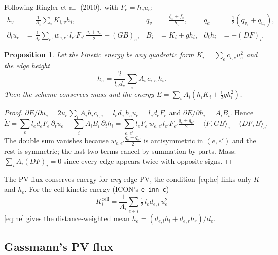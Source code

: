 \documentclass[11pt,a4paper]{article}
\newcommand{\code}[1]{\texttt{#1}}
\newtheorem{proposition}{Proposition}
\begin{document}
Following Ringler et al.\ (2010), with $F_e = h_eu_e$:
\begin{align}
  h_v &= \frac1{A_v}\sum_i K_{i,v}h_i, & q_v &= \frac{\zeta_v + f_v}{h_v}, &
  q_e &= \tfrac12(q_{v_1}+q_{v_2}),\\
  \partial_tu_e &= \frac1{d_e}\sum_{e'}w_{e,e'}\,l_{e'}F_{e'}\,\frac{q_e+q_{e'}}2
     - (G B)_e, & B_i &= K_i + gh_i, &
  \partial_th_i &= -(DF)_i.
\end{align}
\begin{proposition}
\label{prop:trisk}
Let the kinetic energy be any quadratic form $K_i = \sum_e c_{i,e}u_e^2$ and the
edge height
\begin{equation}
  h_e = \frac{2}{l_ed_e}\sum_i A_i\,c_{i,e}\,h_i .
  \label{eq:he}
\end{equation}
Then the scheme conserves mass and the energy $E = \sum_iA_i(h_iK_i + \tfrac12gh_i^2)$.
\end{proposition}
\begin{proof}
$\partial E/\partial u_e = 2u_e\sum_iA_ih_ic_{i,e} = l_ed_e\,h_eu_e = l_ed_eF_e$ and
$\partial E/\partial h_i = A_iB_i$. Hence
\[
  \dot E = \sum_e l_ed_eF_e\,\partial_tu_e + \sum_iA_iB_i\,\partial_th_i
  = \sum_{e,e'} l_eF_e\,w_{e,e'}l_{e'}F_{e'}\tfrac{q_e+q_{e'}}2
    - \langle F,GB\rangle_e - \langle DF,B\rangle_c .
\]
The double sum vanishes because $w_{e,e'}\frac{q_e+q_{e'}}2$ is antisymmetric in
$(e,e')$ and the rest is symmetric; the last two terms cancel by summation by parts.
Mass: $\sum_iA_i(DF)_i = 0$ since every edge appears twice with opposite signs.
\end{proof}
The PV flux conserves energy for \emph{any} edge PV, the condition~\eqref{eq:he}
links only $K$ and $h_e$. For the cell kinetic energy (ICON's \code{e\_inn\_c})
\begin{equation}
  K_i^{\mathrm{cell}} = \frac1{A_i}\sum_{e\in i}\tfrac12\,l_ed_{e,i}\,u_e^2
  \label{eq:Kcell}
\end{equation}
\eqref{eq:he} gives the distance-weighted mean $h_e = (d_{e,l}h_l + d_{e,r}h_r)/d_e$.

\subsection{Gassmann's PV flux}
\end{document}
